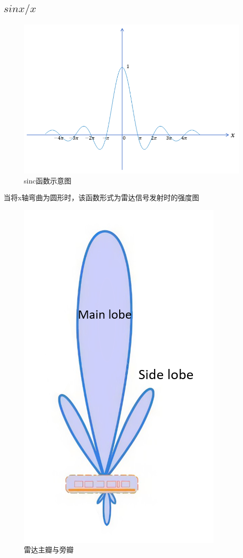 \documentclass[UTF8]{ctexart}
\begin{document}
\subsection{$sinx/x$}
\begin{figure}[h]
    \centering         %
    \includegraphics[scale=0.5]{2.png}
    \caption{sinc函数示意图}
\end{figure}
当将x轴弯曲为圆形时，该函数形式为雷达信号发射时的强度图 \par
\begin{figure}[h]
    \centering         %
    \includegraphics[scale=0.5]{3.png}
    \caption{雷达主瓣与旁瓣}
\end{figure}
\end{document}

